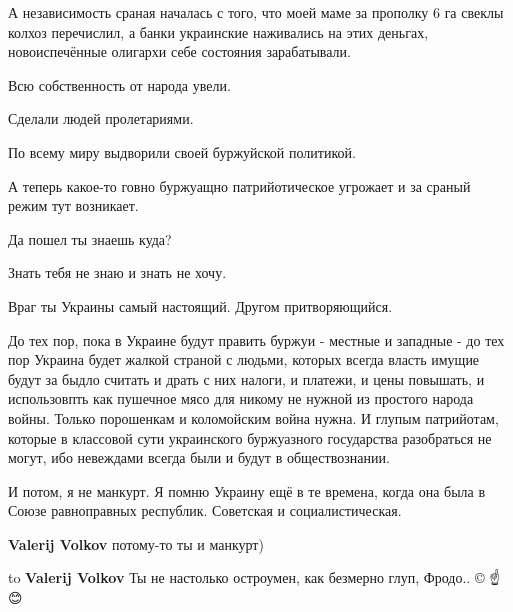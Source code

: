 \begin{itemize}
\begin{itemize}
А независимость сраная началась с того, что моей маме за прополку 6 га свеклы
колхоз перечислил, а банки украинские наживались на этих деньгах,
новоиспечённые олигархи себе состояния зарабатывали.

Всю собственность от народа увели.

Сделали людей пролетариями.

По всему миру выдворили своей буржуйской политикой.

А теперь какое-то говно буржуащно патрийотическое угрожает и за сраный режим
тут возникает.

Да пошел ты знаешь куда?

Знать тебя не знаю и знать не хочу.

Враг ты Украины самый настоящий. Другом притворяющийся.

До тех пор, пока в Украине будут править буржуи - местные и западные - до тех
пор Украина будет жалкой страной с людьми, которых всегда власть имущие будут
за быдло считать и драть с них налоги, и платежи, и цены повышать, и
использовпть как пушечное мясо для никому не нужной из простого народа войны.
Только порошенкам и коломойским война нужна. И глупым патрийотам, которые в
классовой сути украинского буржуазного государства разобраться не могут, ибо
невеждами всегда были и будут в обществознании.


 
И потом, я не манкурт.
Я помню Украину ещё в те времена, когда она была в Союзе равноправных республик. Советская и социалистическая.

 
\textbf{Valerij Volkov} потому-то ты и манкурт)

 
to \textbf{Valerij Volkov}
Ты не настолько остроумен, как безмерно глуп, Фродо.. ©
☝️😊


\end{itemize}
\end{itemize}
